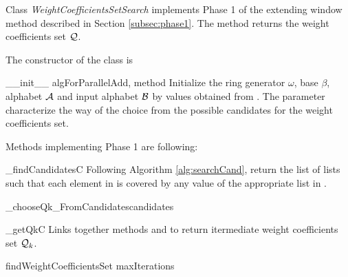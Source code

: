 Class \emph{WeightCoefficientsSetSearch} implements Phase 1 of the extending window method described in Section \ref{subsec:phase1}. The method  returns the weight coefficients set $\mathcal{Q}$.

The constructor of the class is 

\begin{method}{\_\_init\_\_}{ algForParallelAdd, method}
Initialize the ring generator $\omega$, base $\beta$, alphabet $\mathcal{A}$ and input alphabet $\mathcal{B}$ by values obtained from . The parameter  characterize the way of the choice from the possible candidates for the weight coefficients set.  
\end{method}

Methods implementing Phase 1 are following:

\begin{method}{\_findCandidates}{C}
Following Algorithm \ref{alg:searchCand}, return the list of lists  such that each element in  is covered by any value of the appropriate list in .  
\end{method}


\begin{method}{\_chooseQk\_FromCandidates}{candidates}

\end{method}


\begin{method}{\_getQk}{C}
Links together methods  and  to return itermediate weight coefficients set $\mathcal{Q}_k$.
\end{method}


\begin{method}{findWeightCoefficientsSet}{ maxIterations}

\end{method}

